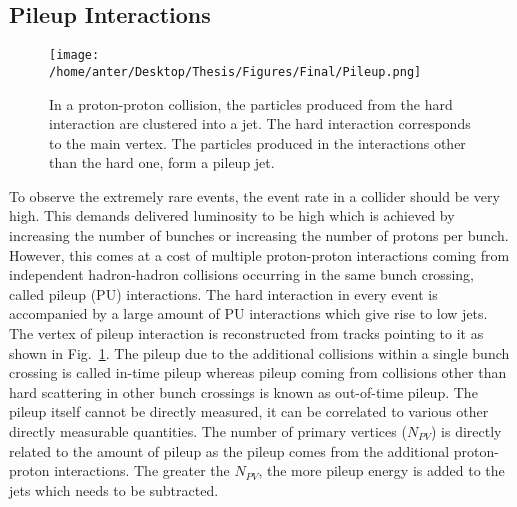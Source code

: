 \subsection{Pileup Interactions}
\begin{figure}[!h]
 \begin{center}
 \vspace*{0mm} 
 \texttt{[image: /home/anter/Desktop/Thesis/Figures/Final/Pileup.png]}\\
 \vspace*{5mm}
 \caption[In a proton-proton collision, the particles produced from the hard interaction are clustered into a jet. The hard interaction corresponds to the main vertex. The particles produced in the interactions other than the hard one, form a pileup jet.]{In a proton-proton collision, the particles produced from the hard interaction are clustered into a jet. The hard interaction corresponds to the main vertex. The particles produced in the interactions other than the hard one, form a pileup jet\footnotemark.}
 \label{fig:pileup_d}
 \end{center}
\end{figure}

To observe the extremely rare events, the event rate in a collider should be very high. This demands delivered luminosity to be high which is achieved by increasing the number of bunches or increasing the number of protons per bunch. However, this comes at a cost of multiple proton-proton interactions coming from independent hadron-hadron collisions occurring in the same bunch crossing, called pileup (PU) interactions. The hard interaction in every event is accompanied by a large amount of PU interactions which give rise to low \pt jets. The vertex of pileup interaction is reconstructed from tracks pointing to it as shown in Fig.~\ref{fig:pileup_d}. The pileup due to the additional collisions within a single bunch crossing is called in-time pileup whereas pileup coming from collisions other than hard scattering in other bunch crossings is known as out-of-time pileup. The pileup itself cannot be directly measured, it can be correlated to various other directly measurable quantities. The number of primary vertices ($N_{PV}$) is directly related to the amount of pileup as the pileup comes from the additional proton-proton interactions. The greater the $N_{PV}$, the more pileup energy is added to the jets which needs to be subtracted. 

